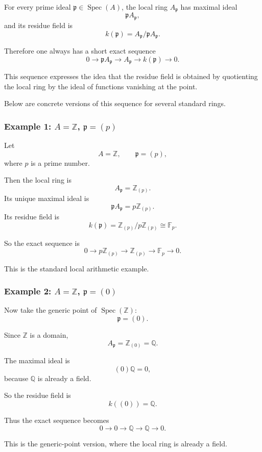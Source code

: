 \documentclass[12pt,a4paper]{article}
\theoremstyle{notespace}
\newcommand{\Spec}{\operatorname{Spec}}
\newcommand{\mf}{\mathfrak}
\theoremstyle{definition}
\begin{document}
For every prime ideal \(\mf p\in \Spec(A)\), the local ring \(A_{\mf p}\) has maximal ideal
\[
\mf p A_{\mf p},
\]
and its residue field is
\[
k(\mf p)=A_{\mf p}/\mf p A_{\mf p}.
\]

Therefore one always has a short exact sequence
\[
0 \longrightarrow \mf p A_{\mf p}
\longrightarrow
A_{\mf p}
\longrightarrow
k(\mf p)
\longrightarrow 0.
\]

This sequence expresses the idea that the residue field is obtained by quotienting the local ring by the ideal of functions vanishing at the point.

Below are concrete versions of this sequence for several standard rings.

\subsubsection{Example 1: \(A=\mathbb Z\), \(\mf p=(p)\)}

Let
\[
A=\mathbb Z,
\qquad
\mf p=(p),
\]
where \(p\) is a prime number.

Then the local ring is
\[
A_{\mf p}=\mathbb Z_{(p)}.
\]
Its unique maximal ideal is
\[
\mf p A_{\mf p}=p\mathbb Z_{(p)}.
\]
Its residue field is
\[
k(\mf p)=\mathbb Z_{(p)}/p\mathbb Z_{(p)}\cong \mathbb F_p.
\]

So the exact sequence is
\[
0
\longrightarrow
p\mathbb Z_{(p)}
\longrightarrow
\mathbb Z_{(p)}
\longrightarrow
\mathbb F_p
\longrightarrow 0.
\]

This is the standard local arithmetic example.

\subsubsection{Example 2: \(A=\mathbb Z\), \(\mf p=(0)\)}

Now take the generic point of \(\Spec(\mathbb Z)\):
\[
\mf p=(0).
\]

Since \(\mathbb Z\) is a domain,
\[
A_{\mf p}=\mathbb Z_{(0)}=\mathbb Q.
\]

The maximal ideal is
\[
(0)\mathbb Q=0,
\]
because \(\mathbb Q\) is already a field.

So the residue field is
\[
k((0))=\mathbb Q.
\]

Thus the exact sequence becomes
\[
0
\longrightarrow
0
\longrightarrow
\mathbb Q
\longrightarrow
\mathbb Q
\longrightarrow 0.
\]

This is the generic-point version, where the local ring is already a field.
\end{document}

